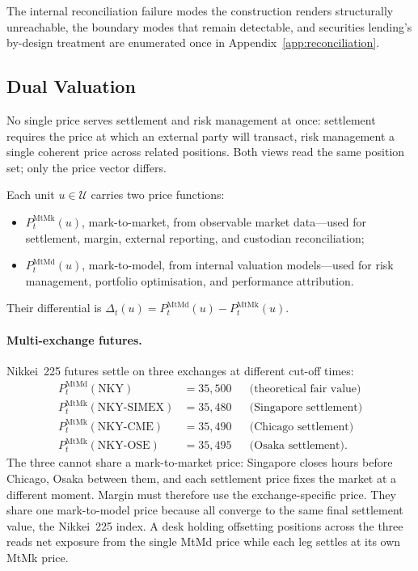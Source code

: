 The internal reconciliation failure modes the construction renders structurally unreachable, the boundary modes that remain detectable, and securities lending's by-design treatment are enumerated once in Appendix~\ref{app:reconciliation}.

\subsection{Dual Valuation}

No single price serves settlement and risk management at once: settlement requires the price at which an external party will transact, risk management a single coherent price across related positions. Both views read the same position set; only the price vector differs.

\begin{definition}
Each unit $u\in\mathcal{U}$ carries two price functions:
\begin{itemize}[nosep]
\item $P_t^{\text{MtMk}}(u)$, mark-to-market, from observable market data---used for settlement, margin, external reporting, and custodian reconciliation;
\item $P_t^{\text{MtMd}}(u)$, mark-to-model, from internal valuation models---used for risk management, portfolio optimisation, and performance attribution.
\end{itemize}
Their differential is $\Delta_t(u)=P_t^{\text{MtMd}}(u)-P_t^{\text{MtMk}}(u)$.
\end{definition}

\paragraph{Multi-exchange futures.} Nikkei~225 futures settle on three exchanges at different cut-off times:
\begin{align*}
P_t^{\text{MtMd}}(\text{NKY}) &= 35{,}500 && \text{(theoretical fair value)}\\
P_t^{\text{MtMk}}(\text{NKY-SIMEX}) &= 35{,}480 && \text{(Singapore settlement)}\\
P_t^{\text{MtMk}}(\text{NKY-CME}) &= 35{,}490 && \text{(Chicago settlement)}\\
P_t^{\text{MtMk}}(\text{NKY-OSE}) &= 35{,}495 && \text{(Osaka settlement)}.
\end{align*}
The three cannot share a mark-to-market price: Singapore closes hours before Chicago, Osaka between them, and each settlement price fixes the market at a different moment. Margin must therefore use the exchange-specific price. They share one mark-to-model price because all converge to the same final settlement value, the Nikkei~225 index. A desk holding offsetting positions across the three reads net exposure from the single MtMd price while each leg settles at its own MtMk price.

